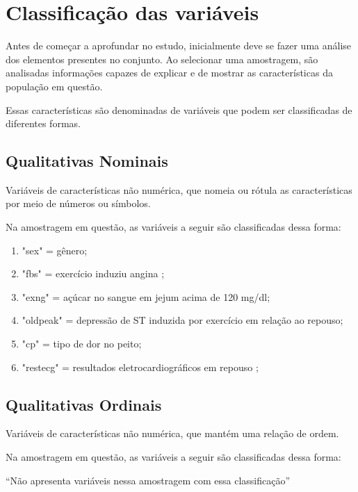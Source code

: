 \chapter{Classificação das variáveis}

    \setcounter{section}{0}

    Antes de começar a aprofundar no estudo, inicialmente deve se fazer uma análise dos elementos 
    presentes no conjunto. Ao selecionar uma amostragem, são analisadas informações capazes de explicar 
    e de mostrar as características da população em questão.

    Essas características são denominadas de variáveis que podem ser classificadas de diferentes formas.

    \section{Qualitativas Nominais}

    Variáveis de características não numérica, que nomeia ou rótula as características por meio de números ou símbolos. 
    
    Na amostragem em questão, as variáveis a seguir são classificadas dessa forma: 

    \begin{enumerate}[label={\alph*)}]
        \addtolength{\itemindent}{1.25cm}
        \item "sex" = gênero;
        \item "fbs" = exercício induziu angina ;
        \item "exng" = açúcar no sangue em jejum acima de 120 mg/dl;
        \item "oldpeak" = depressão de ST induzida por exercício em relação ao repouso;
        \item "cp" = tipo de dor no peito;
        \item "restecg" = resultados eletrocardiográficos em repouso
        ;
    \end{enumerate}

    \section{Qualitativas Ordinais}

    Variáveis de características não numérica, que mantém uma relação de ordem. 
  
    Na amostragem em questão, as variáveis a seguir são classificadas dessa forma: 

    “Não apresenta variáveis nessa amostragem com essa classificação”

